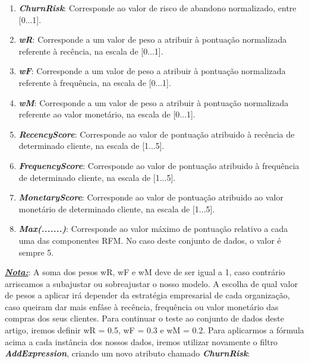 \documentclass{easychair}
\begin{document}
\begin{enumerate}
	\item[\textbullet] \textit{\textbf{ChurnRisk}}: Corresponde ao valor de risco de abandono normalizado, entre [0...1].
	\item[\textbullet] \textit{\textbf{wR}}: Corresponde a um valor de peso a atribuir à pontuação normalizada referente à recência, na escala de [0...1].
	\item[\textbullet] \textit{\textbf{wF}}: Corresponde a um valor de peso a atribuir à pontuação normalizada referente à frequência, na escala de [0...1].
	\item[\textbullet] \textit{\textbf{wM}}: Corresponde a um valor de peso a atribuir à pontuação normalizada referente ao valor monetário, na escala de [0...1].
	\item[\textbullet] \textit{\textbf{RecencyScore}}: Corresponde ao valor de pontuação atribuido à recência de determinado cliente, na escala de [1...5].
	\item[\textbullet] \textit{\textbf{FrequencyScore}}: Corresponde ao valor de pontuação atribuido à frequência de determinado cliente, na escala de [1...5].
	\item[\textbullet] \textit{\textbf{MonetaryScore}}: Corresponde ao valor de pontuação atribuido ao valor monetário de determinado cliente, na escala de [1...5].
	\item[\textbullet] \textit{\textbf{Max(.......)}}: Corresponde ao valor máximo de pontuação relativo a cada uma das componentes RFM. No caso deste conjunto de dados, o valor é sempre 5.
\end{enumerate}

\textit{\textbf{\underline{Nota:}}}: A soma dos pesos wR, wF e wM deve de ser igual a 1, caso contrário arriscamos a subajustar ou sobreajustar o nosso modelo. A escolha de qual valor de pesos a aplicar irá depender da estratégia empresarial de cada organização, caso queiram dar mais enfâse à recência, frequência ou valor monetário das compras dos seus clientes. Para continuar o teste ao conjunto de dados deste artigo, iremos definir wR = 0.5, wF = 0.3 e wM = 0.2.
Para aplicarmos a fórmula acima a cada instância dos nossos dados, iremos utilizar novamente o filtro \textit{\textbf{AddExpression}}, criando um novo atributo chamado \textit{\textbf{ChurnRisk}}:
\end{document}
